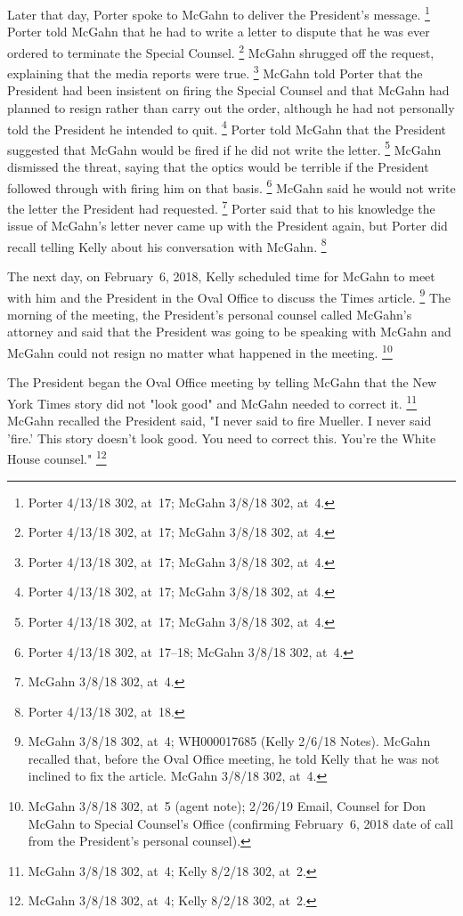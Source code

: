 Later that day, Porter spoke to McGahn to deliver the President's message.%
\footnote{Porter 4/13/18 302, at~17;
McGahn 3/8/18 302, at~4.}
Porter told McGahn that he had to write a letter to dispute that he was ever ordered to terminate the Special Counsel.%
\footnote{Porter 4/13/18 302, at~17;
McGahn 3/8/18 302, at~4.}
McGahn shrugged off the request, explaining that the media reports were true.%
\footnote{Porter 4/13/18 302, at~17;
McGahn 3/8/18 302, at~4.}
McGahn told Porter that the President had been insistent on firing the Special Counsel and that McGahn had planned to resign rather than carry out the order, although he had not personally told the President he intended to quit.%
\footnote{Porter 4/13/18 302, at~17;
McGahn 3/8/18 302, at~4.}
Porter told McGahn that the President suggested that McGahn would be fired if he did not write the letter.%
\footnote{Porter 4/13/18 302, at~17;
McGahn 3/8/18 302, at~4.}
McGahn dismissed the threat, saying that the optics would be terrible if the President followed through with firing him on that basis.%
\footnote{Porter 4/13/18 302, at~17--18;
McGahn 3/8/18 302, at~4.}
McGahn said he would not write the letter the President had requested.%
\footnote{McGahn 3/8/18 302, at~4.}
Porter said that to his knowledge the issue of McGahn's letter never came up with the President again, but Porter did recall telling Kelly about his conversation with McGahn.%
\footnote{Porter 4/13/18 302, at~18.}

The next day, on February~6, 2018, Kelly scheduled time for McGahn to meet with him and the President in the Oval Office to discuss the Times article.%
\footnote{McGahn 3/8/18 302, at~4;
WH000017685 (Kelly 2/6/18 Notes).
McGahn recalled that, before the Oval Office meeting, he told Kelly that he was not inclined to fix the article.
McGahn 3/8/18 302, at~4.}
The morning of the meeting, the President's personal counsel called McGahn's attorney and said that the President was going to be speaking with McGahn and McGahn could not resign no matter what happened in the meeting.%
\footnote{McGahn 3/8/18 302, at~5 (agent note);
2/26/19 Email, Counsel for Don McGahn to Special Counsel's Office (confirming February~6, 2018 date of call from the President's personal counsel).}

The President began the Oval Office meeting by telling McGahn that the New York Times story did not "look good" and McGahn needed to correct it.%
\footnote{McGahn 3/8/18 302, at~4; Kelly 8/2/18 302, at~2.}
McGahn recalled the President said, "I never said to fire Mueller.
I never said 'fire.'
This story doesn't look good.
You need to correct this.
You're the White House counsel."%
\footnote{McGahn 3/8/18 302, at~4; Kelly 8/2/18 302, at~2.}

